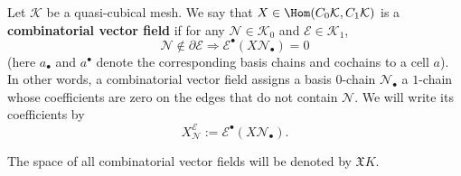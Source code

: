 \begin{definition}
  Let $\mathcal{K}$ be a quasi-cubical mesh.
  We say that $X \in \Hom(C_0 \mathcal{K}, C_1 \mathcal{K})$
  is a \textbf{combinatorial vector field} if for any
  $\mathcal{N} \in \mathcal{K}_0$ and $\mathcal{E} \in \mathcal{K}_1$,
  \begin{equation}
    \mathcal{N} \notin \partial \mathcal{E} \Rightarrow
    \mathcal{E}^\bullet(X \mathcal{N}_\bullet) = 0
  \end{equation}
  (here $a_\bullet$ and $a^\bullet$ denote the corresponding basis chains and
  cochains to a cell $a$).
  In other words, a combinatorial vector field assigns a basis $0$-chain
  $\mathcal{N}_\bullet$ a $1$-chain whose coefficients are zero on the edges
  that do not contain $\mathcal{N}$.
  We will write its coefficients by
  \begin{equation}
    X^{\mathcal{E}}_{\mathcal{N}} := \mathcal{E}^\bullet(X \mathcal{N}_\bullet).
  \end{equation}

  The space of all combinatorial vector fields will be denoted by
  $\mathfrak{X} K$.
\end{definition}
